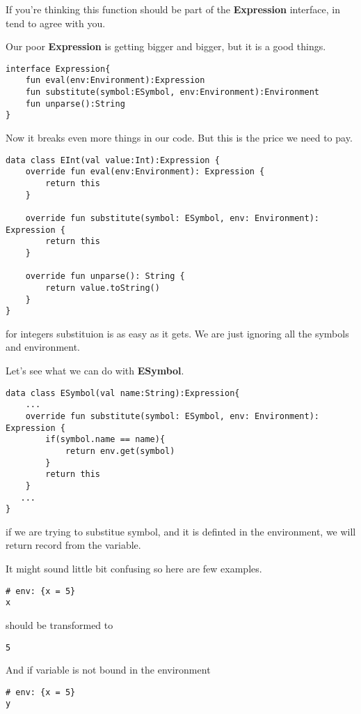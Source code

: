 \documentclass[11pt]{article}
\begin{document}
If you're thinking this function should be part of the \textbf{Expression} interface, in tend to agree with you.

Our poor \textbf{Expression} is getting bigger and bigger, but it is a good things.

\begin{verbatim}
interface Expression{
    fun eval(env:Environment):Expression
    fun substitute(symbol:ESymbol, env:Environment):Environment
    fun unparse():String
}
\end{verbatim}

Now it breaks even more things in our code. But this is the price we need to pay.

\begin{verbatim}
data class EInt(val value:Int):Expression {
    override fun eval(env:Environment): Expression {
        return this
    }

    override fun substitute(symbol: ESymbol, env: Environment): Expression {
        return this
    }

    override fun unparse(): String {
        return value.toString()
    }
}
\end{verbatim}

for integers substituion is as easy as it gets.
We are just ignoring all the symbols and environment.

Let's see what we can do with \textbf{ESymbol}.
\begin{verbatim}
data class ESymbol(val name:String):Expression{
    ...
    override fun substitute(symbol: ESymbol, env: Environment): Expression {
        if(symbol.name == name){
            return env.get(symbol)
        }
        return this
    }
   ...
}
\end{verbatim}

if we are trying to substitue symbol, and it is definted in the environment, we will return record from the variable.

It might sound little bit confusing so here are few examples.

\begin{verbatim}
# env: {x = 5}
x
\end{verbatim}

should be transformed to

\begin{verbatim}
5
\end{verbatim}

And if variable is not bound in the environment
\begin{verbatim}
# env: {x = 5}
y
\end{verbatim}
\end{document}
